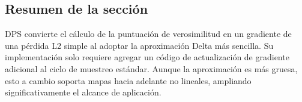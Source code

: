 \subsection{Resumen de la sección}

DPS convierte el cálculo de la puntuación de verosimilitud en un gradiente de una pérdida L2 simple al adoptar la aproximación Delta más sencilla. Su implementación solo requiere agregar un código de actualización de gradiente adicional al ciclo de muestreo estándar. Aunque la aproximación es más gruesa, esto a cambio soporta mapas hacia adelante no lineales, ampliando significativamente el alcance de aplicación.
